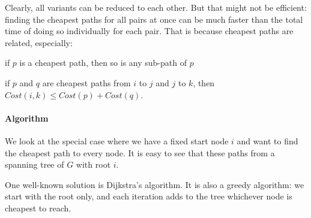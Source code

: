 Clearly, all variants can be reduced to each other.
But that might not be efficient: finding the cheapest paths for all pairs at once can be much faster than the total time of doing so individually for each pair.
That is because cheapest paths are related, especially:
\begin{compactitem}
  \item if $p$ is a cheapest path, then so is any sub-path of $p$
  \item if $p$ and $q$ are cheapest paths from $i$ to $j$ and $j$ to $k$, then $Cost(i,k)\leq Cost(p)+Cost(q)$.
\end{compactitem}

\paragraph{Algorithm}
We look at the special case where we have a fixed start node $i$ and want to find the cheapest path to every node.
It is easy to see that these paths from a spanning tree of $G$ with root $i$.

One well-known solution is Dijkstra's algorithm.
It is also a greedy algorithm: we start with the root only, and each iteration adds to the tree whichever node is cheapest to reach.

\begin{acode}
\\
\end{acode}


